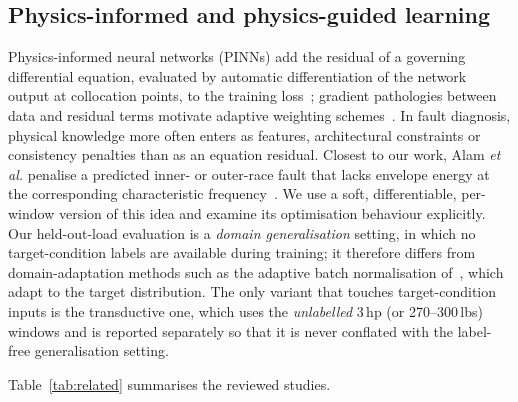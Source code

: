 \documentclass[conference]{IEEEtran}
\begin{document}
\subsection{Physics-informed and physics-guided learning}
Physics-informed neural networks (PINNs) add the residual of a governing
differential equation, evaluated by automatic differentiation of the network
output at collocation points, to the training loss~\cite{raissi2019}; gradient
pathologies between data and residual terms motivate adaptive weighting
schemes~\cite{wang2021,mcclenny2023}. In fault diagnosis, physical knowledge
more often enters as features, architectural constraints or consistency
penalties than as an equation residual. Closest to our work, Alam \emph{et al.}
penalise a predicted inner- or outer-race fault that lacks envelope energy at
the corresponding characteristic frequency~\cite{alam2025}. We use a soft,
differentiable, per-window version of this idea and examine its optimisation
behaviour explicitly. Our held-out-load evaluation is a \emph{domain
generalisation} setting, in which no target-condition labels are available
during training; it therefore differs from domain-adaptation methods such as the
adaptive batch normalisation of~\cite{zhang2017}, which adapt to the target
distribution. The only variant that touches target-condition inputs is the
transductive one, which uses the \emph{unlabelled} 3\,hp (or 270--300\,lbs)
windows and is reported separately so that it is never conflated with the
label-free generalisation setting.

Table~\ref{tab:related} summarises the reviewed studies.
\end{document}
